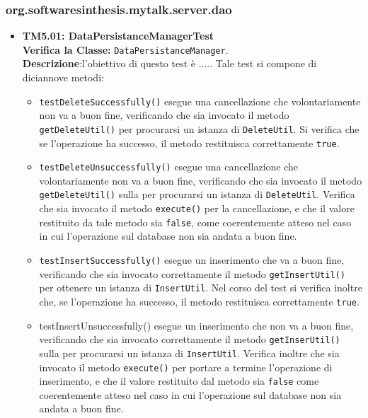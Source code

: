\subsubsection{org.softwaresinthesis.mytalk.server.dao}
\begin{itemize}


\item \textbf{TM5.01: DataPersistanceManagerTest}\\
\textbf{Verifica la Classe:} \texttt{DataPersistanceManager}.\\
\textbf{Descrizione}:l'obiettivo di questo test è .....
Tale test si compone di diciannove metodi:
\begin{itemize}
\item \texttt{testDeleteSuccessfully()} esegue una cancellazione che volontariamente non va a buon fine, verificando che sia invocato il metodo \texttt{getDeleteUtil()} per procurarsi  un istanza di \texttt{DeleteUtil}. Si verifica che se l'operazione ha successo, il metodo restituisca correttamente \texttt{true}.

\item \texttt{testDeleteUnsuccessfully()} esegue una cancellazione che volontariamente non va a buon fine, verificando che sia invocato il metodo \texttt{getDeleteUtil()} sulla  per procurarsi  un istanza di \texttt{DeleteUtil}. Verifica che sia invocato il metodo \texttt{execute()} per la cancellazione, e che il valore restituito da tale metodo sia \texttt{false}, come coerentemente atteso nel caso in cui l'operazione sul database non sia andata a buon fine.

\item \texttt{testInsertSuccessfully()} esegue un inserimento che va a buon fine, verificando che sia invocato correttamente il metodo \texttt{getInsertUtil()} per ottenere un istanza di \texttt{InsertUtil}. Nel corso del test si verifica inoltre che, se l'operazione ha successo, il metodo restituisca correttamente \texttt{true}.

\item \texttt{}testInsertUnsuccessfully() esegue un inserimento che non va a buon fine, verificando che sia invocato correttamente il metodo \texttt{getInserUtil()} sulla  per procurarsi un istanza di \texttt{InsertUtil}. Verifica inoltre che sia invocato il metodo \texttt{execute()} per portare a termine l'operazione di inserimento, e che il valore restituito dal metodo sia \texttt{false} come coerentemente atteso nel caso in cui l'operazione sul database non sia andata a buon fine.


\end{itemize}
\end{itemize}
